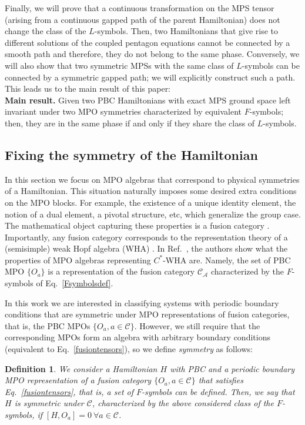 \documentclass[a4paper,twocolumn,11pt,accepted=2023-02-10]{quantumarticle}
\newtheorem{definition}{Definition}
\begin{document}
Finally, we will prove that a continuous transformation on the MPS tensor (arising from a continuous gapped path of the parent Hamiltonian) does not change the class of the ${L}$-symbols. Then, two Hamiltonians that give rise to different solutions of the coupled pentagon equations cannot be connected by a smooth path and therefore, they do not belong to the same phase. Conversely, we will also show that two symmetric MPSs with the same class of $L$-symbols can be connected by a symmetric gapped path; we will explicitly construct such a path. This leads us to the main result of this paper:
\\

{\bf Main result.} Given two PBC Hamiltonians with exact MPS ground space left invariant under two MPO symmetries characterized by equivalent $F$-symbols; then, they are in the same phase if and only if they share the class of ${L}$-symbols.


\subsection{Fixing the symmetry of the Hamiltonian}\label{sec:fixsym}

In this section we focus on MPO algebras that correspond to physical symmetries of a Hamiltonian. This situation naturally imposes some desired extra conditions on the MPO blocks. For example, the existence of a unique identity element, the notion of a dual element, a pivotal structure, etc, which generalize the group case. The mathematical object capturing these properties is a fusion category \cite{etingof2017fusion}. Importantly, any fusion category corresponds to the representation theory of a (semisimple) weak Hopf algebra (WHA) \cite{ostrik2001module}. In Ref.\ \cite{molnar22}, the authors show what the properties of MPO algebras representing $C^*$-WHA are. Namely, the set of PBC MPO $\{ O_a \}$ is a representation of the fusion category $\mathcal{C}_\mathcal{A}$ characterized by the $F$-symbols of Eq.\ \eqref{Fsymbolsdef}. 


In this work we are interested in classifying systems with periodic boundary conditions that are symmetric under MPO representations of fusion categories, that is, the PBC MPOs $\{ O_a, a\in \mathcal{C} \}$. However, we still require that the corresponding MPOs form an algebra with arbitrary boundary conditions (equivalent to Eq.\ \eqref{fusiontensors}), so we define {\it symmetry} as follows:

\begin{definition}\label{defsym}
We consider a Hamiltonian $H$ with PBC and a periodic boundary MPO representation of a fusion category $\{ O_a, a\in \mathcal{C} \}$ that satisfies Eq.\ \eqref{fusiontensors}, that is, a set of $F$-symbols can be defined. Then, we say that $H$ is symmetric under $\mathcal{C}$, characterized by the above considered class of the $F$-symbols, if $[H,O_a]=0 \ \forall a\in \mathcal{C}$. 
\end{definition}
\end{document}
